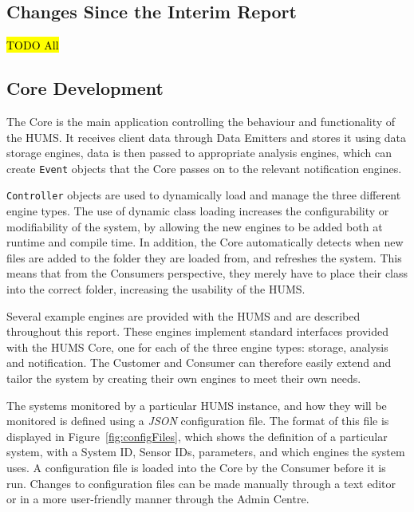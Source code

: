 \documentclass[10pt,a4paper]{article}
\begin{document}
\subsection{Changes Since the Interim Report}
\label{sec:changes}
\hl{TODO All}

\subsection{Core Development}
\label{sec:core}

The Core is the main application controlling the behaviour and functionality of the HUMS. It receives client data through Data Emitters and stores it using data storage engines, data is then passed to appropriate analysis engines, which can create \texttt{Event} objects that the Core passes on to the relevant notification engines.

\texttt{Controller} objects are used to dynamically load and manage the three different engine types. The use of dynamic class loading increases the configurability or modifiability of the system, by allowing the new engines to be added both at runtime and compile time. In addition, the Core automatically detects when new files are added to the folder they are loaded from, and refreshes the system. This means that from the Consumers perspective, they merely have to place their class into the correct folder, increasing the usability of the HUMS. 

Several example engines are provided with the HUMS and are described throughout this report. These engines implement standard interfaces provided with the HUMS Core, one for each of the three engine types: storage, analysis and notification. The Customer and Consumer can therefore easily extend and tailor the system by creating their own engines to meet their own needs.

The systems monitored by a particular HUMS instance, and how they will be monitored is defined using a \emph{JSON} configuration file.
The format of this file is displayed in Figure~\ref{fig:configFiles}, which shows the definition of a particular system, with a System ID, Sensor IDs, parameters, and which engines the system uses.
A configuration file is loaded into the Core by the Consumer before it is run. Changes to configuration files can be made manually through a text editor or in a more user-friendly manner through the Admin Centre.
\end{document}
